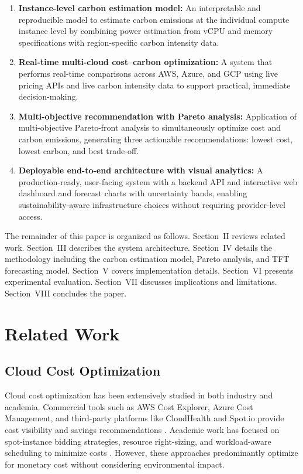 \documentclass[conference]{IEEEtran}
\begin{document}
\begin{enumerate}
    \item \textbf{Instance-level carbon estimation model:} An interpretable and reproducible model to estimate carbon emissions at the individual compute instance level by combining power estimation from vCPU and memory specifications with region-specific carbon intensity data.
    \item \textbf{Real-time multi-cloud cost--carbon optimization:} A system that performs real-time comparisons across AWS, Azure, and GCP using live pricing APIs and live carbon intensity data to support practical, immediate decision-making.
    \item \textbf{Multi-objective recommendation with Pareto analysis:} Application of multi-objective Pareto-front analysis to simultaneously optimize cost and carbon emissions, generating three actionable recommendations: lowest cost, lowest carbon, and best trade-off.
    \item \textbf{Deployable end-to-end architecture with visual analytics:} A production-ready, user-facing system with a backend API and interactive web dashboard and forecast charts with uncertainty bands, enabling sustainability-aware infrastructure choices without requiring provider-level access.
\end{enumerate}

The remainder of this paper is organized as follows. Section~II reviews related work. Section~III describes the system architecture. Section~IV details the methodology including the carbon estimation model, Pareto analysis, and TFT forecasting model. Section~V covers implementation details. Section~VI presents experimental evaluation. Section~VII discusses implications and limitations. Section~VIII concludes the paper.

\section{Related Work}

\subsection{Cloud Cost Optimization}

Cloud cost optimization has been extensively studied in both industry and academia. Commercial tools such as AWS Cost Explorer, Azure Cost Management, and third-party platforms like CloudHealth and Spot.io provide cost visibility and savings recommendations \cite{b5}. Academic work has focused on spot-instance bidding strategies, resource right-sizing, and workload-aware scheduling to minimize costs \cite{b6}. However, these approaches predominantly optimize for monetary cost without considering environmental impact.
\end{document}

